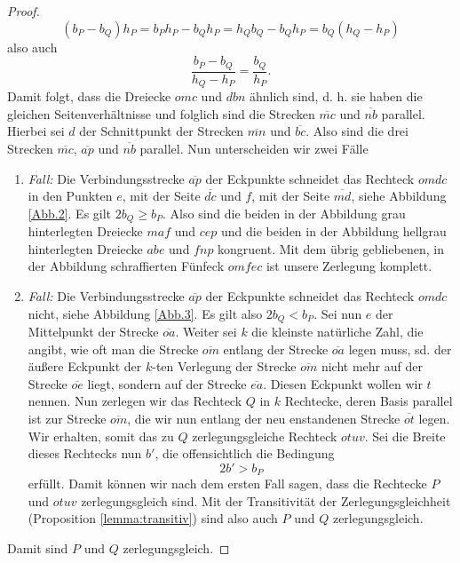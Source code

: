 \documentclass[11pt,titlepage]{article}
\theoremstyle{definition}
\theoremstyle{remark}
\begin{document}
\begin{proof}
		\[ (b_P-b_Q)h_P=b_P h_P-b_Q h_P=h_Qb_Q-b_Qh_P=b_Q(h_Q-h_P) \]
		also auch
		\[\frac{b_P-b_Q}{h_Q-h_P}=\frac{b_Q}{h_P}. \]
		Damit folgt, dass die Dreiecke $omc$ und $dbn$ ähnlich sind, d. h. 
		sie haben die gleichen Seitenverhältnisse und folglich sind die Strecken $\overline{mc}$ 
		und $\overline{nb}$ parallel. Hierbei sei $d$ der Schnittpunkt der Strecken $\overline{mn}$ und 
		$\overline{bc}$. Also sind die drei Strecken $\overline{mc}$, $\overline{ap}$ und $\overline{nb}$ 
		parallel. Nun unterscheiden wir zwei Fälle
		\begin{enumerate}
			\item \textsl{Fall:} Die Verbindungsstrecke $\overline{ap}$ der Eckpunkte schneidet das 
			Rechteck $omdc$ in den Punkten $e$, mit der Seite $\overline{dc}$ und $f$, mit der Seite $\overline{md}$, siehe Abbildung \ref{Abb.2}. 
			Es gilt $2b_Q\geq b_P$.
			Also sind die beiden in der Abbildung grau hinterlegten Dreiecke $maf$ und $cep$ und die beiden 
			in der Abbildung hellgrau hinterlegten Dreiecke $abe$ und $fnp$ kongruent. Mit dem übrig gebliebenen, 
			in der Abbildung schraffierten Fünfeck $omfec$ ist unsere Zerlegung komplett.
			
			\item \textsl{Fall:} Die Verbindungsstrecke $\overline{ap}$ der Eckpunkte schneidet das 
			Rechteck $omdc$ nicht, siehe Abbildung \ref{Abb.3}. 
			Es gilt also $2b_Q<b_P$. Sei nun $e$ der Mittelpunkt der Strecke $\overline{oa}$. Weiter sei $k$ die 
			kleinste natürliche Zahl, die angibt, wie oft man die Strecke $\overline{om}$ entlang der Strecke $\overline{oa}$ 
			legen muss, sd. der äußere Eckpunkt der $k$-ten Verlegung der Strecke 
			$\overline{om}$ nicht mehr auf der Strecke $\overline{oe}$ liegt, 
			sondern auf der Strecke $\overline{ea}$. Diesen Eckpunkt wollen 
			wir $t$ nennen. 
			Nun zerlegen wir das Rechteck $Q$ in $k$ Rechtecke, deren 
			Basis parallel ist zur Strecke $\overline{om}$, die wir nun entlang der neu enstandenen Strecke 
			$\overline{ot}$ legen. Wir erhalten, somit das zu $Q$ zerlegungsgleiche Rechteck $otuv$. 
			Sei die Breite dieses Rechtecks nun $b'$, die offensichtlich die Bedingung
			\[ 2b'>b_P \]
			erfüllt. Damit können wir nach dem ersten Fall sagen, dass die Rechtecke $P$ und $otuv$ 
			zerlegungsgleich sind. Mit der Transitivität der 
			Zerlegungsgleichheit (Proposition \ref{lemma:transitiv}) sind 
			also auch $P$ und $Q$ zerlegungsgleich.
		\end{enumerate}
		Damit sind $P$ und $Q$ zerlegungsgleich.
	\end{proof}
	
\end{document}

